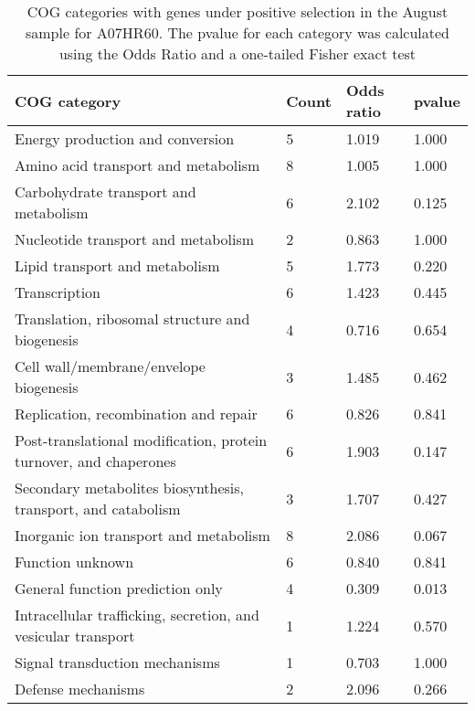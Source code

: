 \begin{table}[hb]
\footnotesize 
	\tabcolsep=0.11cm 
\caption{COG categories with genes under positive selection in the August sample for A07HR60. The pvalue for each category was calculated using the Odds Ratio and a one-tailed Fisher exact test} 
\begin{tabularx}{\textwidth}{L{6cm}R{2cm}R{2cm}R{2cm}} 
\hline 
\textbf{COG category} & \textbf{Count} & \textbf{Odds ratio} & \textbf{pvalue} \\ 
\hline 
Energy production and conversion & 5 & 1.019 & 1.000 \\ 
Amino acid transport and metabolism & 8 & 1.005 & 1.000 \\ 
Carbohydrate transport and metabolism & 6 & 2.102 & 0.125 \\ 
Nucleotide transport and metabolism & 2 & 0.863 & 1.000 \\ 
Lipid transport and metabolism & 5 & 1.773 & 0.220 \\ 
Transcription & 6 & 1.423 & 0.445 \\ 
Translation, ribosomal structure and biogenesis & 4 & 0.716 & 0.654 \\ 
Cell wall/membrane/envelope biogenesis & 3 & 1.485 & 0.462 \\ 
Replication, recombination and repair & 6 & 0.826 & 0.841 \\ 
Post-translational modification, protein turnover, and chaperones & 6 & 1.903 & 0.147 \\ 
Secondary metabolites biosynthesis, transport, and catabolism & 3 & 1.707 & 0.427 \\ 
Inorganic ion transport and metabolism & 8 & 2.086 & 0.067 \\ 
Function unknown & 6 & 0.840 & 0.841 \\ 
General function prediction only & 4 & 0.309 & 0.013 \\ 
Intracellular trafficking, secretion, and vesicular transport & 1 & 1.224 & 0.570 \\ 
Signal transduction mechanisms & 1 & 0.703 & 1.000 \\ 
Defense mechanisms & 2 & 2.096 & 0.266 \\ 
\end{tabularx} 
\label{August_COG_Selection_A07HR60} 
 \end{table} 


